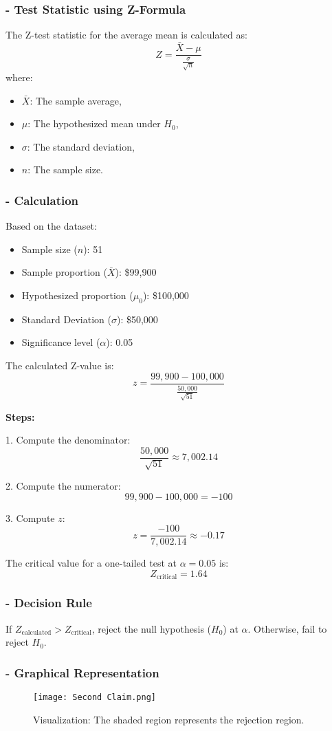 \documentclass[12pt,a4paper]{article}
\begin{document}
\subsubsection*{- Test Statistic using Z-Formula}
The Z-test statistic for the average mean is calculated as:
\[
Z = \frac{\bar{X} - \mu}{\frac{\sigma}{\sqrt{n}}}
\]
where:
\begin{itemize}
    \item $\bar{X}$: The sample average,
    \item $\mu $: The hypothesized mean under $H_0$,
    \item $\sigma $: The standard deviation,
    \item $n$: The sample size.
\end{itemize}
\vspace{1em}
\subsubsection*{- Calculation}
Based on the dataset:
\begin{itemize}
    \item Sample size ($n$): 51
    \item Sample proportion ($\bar{X}$): \$99,900
    \item Hypothesized proportion ($\mu_0$): \$100,000
    \item Standard Deviation ($\sigma$): \$50,000
    \item Significance level ($\alpha$): 0.05
\end{itemize}
\newpage
The calculated Z-value is:
\[
z = \frac{99,900 - 100,000}{\frac{50,000}{\sqrt{51}}}
\]

\textbf{Steps:}

1. Compute the denominator:
\[
\frac{50,000}{\sqrt{51}} \approx 7,002.14
\]

2. Compute the numerator:
\[
99,900 - 100,000 = -100
\]

3. Compute \( z \):
\[
z = \frac{-100}{7,002.14} \approx -0.17
\]

The critical value for a one-tailed test at $\alpha = 0.05$ is:
\[
Z_{\text{critical}} = 1.64
\]
\subsubsection*{- Decision Rule}
If $Z_{\text{calculated}} > Z_{\text{critical}}$, reject the null hypothesis ($H_0$) at $\alpha$.  Otherwise, fail to reject $H_0$.

\subsubsection*{- Graphical Representation}
\begin{figure}[htbp]
    \centering
    \texttt{[image: Second Claim.png]} 
    \caption{Visualization: The shaded region represents the rejection region.}
    \label{fig:z-test}
\end{figure}
\end{document}
